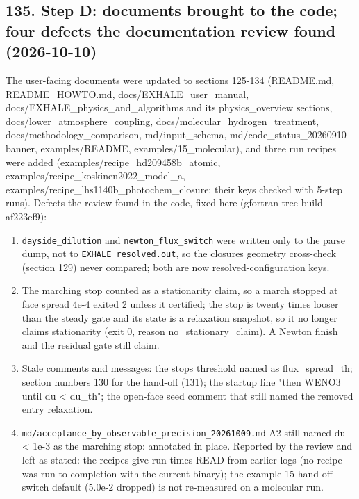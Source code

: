 \documentclass[english,a4paper]{my_memo}
\providecommand{\tightlist}{\setlength{\itemsep}{0pt}\setlength{\parskip}{0pt}}
\begin{document}
\subsection{135. Step D: documents brought to the code; four defects the documentation review found (2026-10-10)}\label{135-step-d-documents-brought-to-the-code-four-defects-the-documentation-review-found-2026-10-10}

The user-facing documents were updated to sections 125-134 (README.md,
README\_HOWTO.md, docs/EXHALE\_user\_manual, docs/EXHALE\_physics\_and\_algorithms and
its physics\_overview sections, docs/lower\_atmosphere\_coupling,
docs/molecular\_hydrogen\_treatment, docs/methodology\_comparison, md/input\_schema,
md/code\_status\_20260910 banner, examples/README, examples/15\_molecular), and
three run recipes were added (examples/recipe\_hd209458b\_atomic,
examples/recipe\_koskinen2022\_model\_a, examples/recipe\_lhs1140b\_photochem\_closure;
their keys checked with 5-step runs). Defects the review found in the code,
fixed here (gfortran tree build af223ef9):

\begin{enumerate}
\def\labelenumi{\arabic{enumi}.}
\tightlist
\item
  \texttt{dayside\_dilution} and \texttt{newton\_flux\_switch} were written only to the parse
  dump, not to \texttt{EXHALE\_resolved.out}, so the closure\textquotesingle s geometry cross-check
  (section 129) never compared; both are now resolved-configuration keys.
\item
  The marching stop counted as a stationarity claim, so a march stopped at
  face spread 4e-4 exited 2 unless it certified; the stop is twenty times
  looser than the steady gate and its state is a relaxation snapshot, so it
  no longer claims stationarity (exit 0, reason no\_stationary\_claim). A
  Newton finish and the residual gate still claim.
\item
  Stale comments and messages: the stop\textquotesingle s threshold named as flux\_spread\_th;
  section numbers 130 for the hand-off (131); the startup line "then WENO3
  until du \textless{} du\_th"; the open-face seed comment that still named the removed
  entry relaxation.
\item
  \texttt{md/acceptance\_by\_observable\_precision\_20261009.md} A2 still named
  du \textless{} 1e-3 as the marching stop: annotated in place.
  Reported by the review and left as stated: the recipes give run times READ from
  earlier logs (no recipe was run to completion with the current binary); the
  example-15 hand-off switch default (5.0e-2 dropped) is not re-measured on a
  molecular run.
\end{enumerate}
\end{document}
